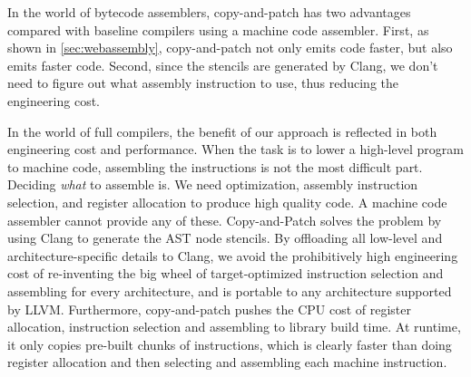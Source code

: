 \documentclass[acmsmall,nonacm,screen]{acmart}\settopmatter{printfolios=true,printccs=true,printacmref=false}
\newcommand{\secref}[1]{\autoref{#1}}
\newcommand{\llvm}{LLVM}
\newcommand{\cp}{copy-and-patch}
\newcommand{\cpcap}{Copy-and-Patch}
\begin{document}
In the world of bytecode assemblers, \cp{} has two advantages compared with baseline compilers using a machine code assembler. First, as shown in \secref{sec:webassembly}, \cp{} not only emits code faster, but also emits faster code.
Second, since the stencils are generated by Clang, we don't need to figure out what assembly instruction to use, thus reducing the engineering cost.

In the world of full compilers, the benefit of our approach is reflected in both engineering cost and performance. When the task is to lower a high-level program to machine code, assembling the instructions is not the most difficult part. Deciding \textit{what} to assemble is. We need optimization, assembly instruction selection, and register allocation to produce high quality code. A machine code assembler cannot provide any of these. \cpcap{} solves the problem by using Clang to generate the AST node stencils. By offloading all low-level and architecture-specific details to Clang, we avoid the prohibitively high engineering cost of re-inventing the big wheel of target-optimized instruction selection and assembling for every architecture,
and is portable to any architecture supported by \llvm{}. Furthermore, \cp{} pushes the CPU cost of register allocation, instruction selection and assembling to library build time. At runtime, it only copies pre-built chunks of instructions, which is clearly faster than doing register allocation and then selecting and assembling each machine instruction. 

\end{document}
